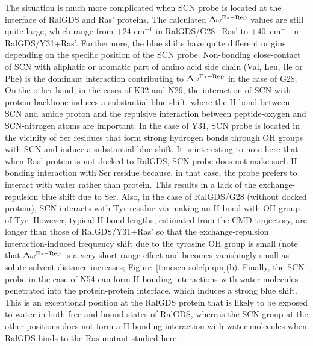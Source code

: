 \documentclass[b5paper,oneside,fleqn,11pt]{book}
\begin{document}
\begin{refsection}
The situation is much more complicated when SCN probe is
located at the interface of RalGDS and Ras' proteins. 
The calculated $\Delta\omega^{\rm Ex-Rep}$ values are still quite large, which
range from +24 cm$^{-1}$ in RalGDS/G28+Ras' to +40~cm$^{-1}$ in
RalGDS/Y31+Ras'. Furthermore, the blue shifts have quite
different origins depending on the specific position of the SCN
probe. Non\hyp{}bonding close\hyp{}contact of SCN with aliphatic or
aromatic part of amino acid side chain (Val, Leu, Ile or Phe) is
the dominant interaction contributing to $\Delta\omega^{\rm Ex-Rep}$ in the case of
G28. On the other hand, in the cases of K32 and N29, the
interaction of SCN with protein backbone induces a substantial
blue shift, where the H-bond between SCN and amide proton
and the repulsive interaction between peptide\hyp{}oxygen and
SCN-nitrogen atoms are important. In the case of Y31, SCN
probe is located in the vicinity of Ser residues that form strong
hydrogen bonds through OH groups with SCN and induce a
substantial blue shift. It is interesting to note here that when
Ras' protein is not docked to RalGDS, SCN probe does not
make such H-bonding interaction with Ser residue because, in
that case, the probe prefers to interact with water rather than
protein. This results in a lack of the exchange\hyp{}repulsion blue
shift due to Ser. Also, in the case of RalGDS/G28 (without
docked protein), SCN interacts with Tyr residue via making an
H-bond with OH group of Tyr. However, typical H-bond
lengths, estimated from the CMD trajectory, are longer than
those of RalGDS/Y31+Ras' so that the exchange\hyp{}repulsion
interaction\hyp{}induced frequency shift due to the tyrosine OH
group is small (note that $\Delta\omega^{\rm Ex-Rep}$ is a very short\hyp{}range effect
and becomes vanishingly small as solute\hyp{}solvent distance
increases; Figure~\ref{f:mescn-solefp-qm}(b). %
Finally, the SCN probe in the case of
N54 can form H-bonding interactions with water molecules
penetrated into the protein-protein interface, which induces a
strong blue shift. This is an exceptional position at the RalGDS
protein that is likely to be exposed to water in both free and
bound states of RalGDS, whereas the SCN group at the other
positions does not form a H-bonding interaction with water
molecules when RalGDS binds to the Ras mutant studied here.


\end{refsection}
\end{document}
